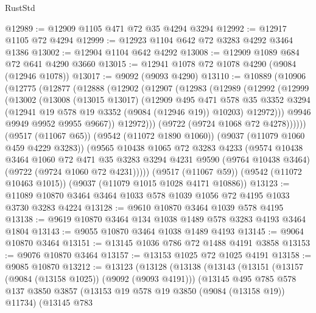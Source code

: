 \begin{lexlean}{RustStd}
\begin{coremodule}
@12989 := @12909 @1105 @471 @72 @35 @4294 @3294
@12992 := @12917 @1105 @72 @4294
@12999 := @12923 @1104 @642 @72 @3283 @4292 @3464 @1386
@13002 := @12904 @1104 @642 @4292
@13008 := @12909 @1089 @684 @72 @641 @4290 @3660
@13015 := @12941 @1078 @72 @1078 @4290 (@9084 (@12946 @1078))
@13017 := @9092 (@9093 @4290)
@13110 := @10889
    (@10906
      (@12775
        (@12877
          (@12888
            (@12902
              (@12907
                (@12983
                  (@12989
                    (@12992
                      (@12999
                        (@13002
                          (@13008
                            (@13015 @13017)
                            (@12909
                              @495
                              @471
                              @578
                              @35
                              @3352
                              @3294
                              (@12941 @19 @578 @19 @3352 (@9084 (@12946 @19)) @10203)
                              @12972)))
                        @9946
                        @9949
                        @9952
                        @9955
                        @9667))
                    @12972)))
              (@9722 (@9724 @1068 @72 @4278))))))
      (@9517 (@11067 @65))
      (@9542 (@11072 @1890 @1060))
      (@9037 (@11079 @1060 @459 @4229 @3283))
      (@9565
        @10438
        @1065
        @72
        @3283
        @4233
        (@9574
          @10438
          @3464
          @1060
          @72
          @471
          @35
          @3283
          @3294
          @4231
          @9590
          (@9764 @10438 @3464)
          (@9722 (@9724 @1060 @72 @4231)))))
    (@9517 (@11067 @59))
    (@9542 (@11072 @10463 @1015))
    (@9037 (@11079 @1015 @1028 @4171 @10886))
@13123 := @11089 @10870 @3464 @3464 @1033 @578 @1039 @1056 @72 @4195 @1033 @3730 @3283 @4224
@13128 := @9610 @10870 @3464 @1039 @578 @4195
@13138 := @9619 @10870 @3464 @134 @1038 @1489 @578 @3283 @4193 @3464 @1804
@13143 := @9055 @10870 @3464 @1038 @1489 @4193
@13145 := @9064 @10870 @3464
@13151 := @13145 @1036 @786 @72 @1488 @4191 @3858
@13153 := @9076 @10870 @3464
@13157 := @13153 @1025 @72 @1025 @4191
@13158 := @9085 @10870
@13212 := @13123
    (@13128
      (@13138
        (@13143
          (@13151
            (@13157 (@9084 (@13158 @1025)) (@9092 (@9093 @4191)))
            (@13145
              @495
              @785
              @578
              @137
              @3850
              @3857
              (@13153 @19 @578 @19 @3850 (@9084 (@13158 @19)) @11734)
              (@13145
                @783

\end{coremodule}
\end{lexlean}

